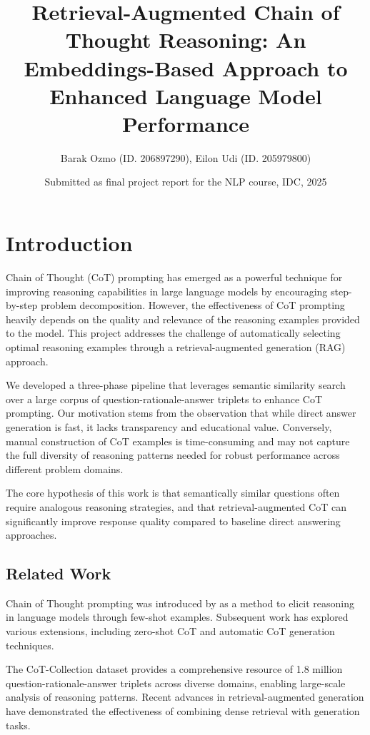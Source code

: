 \documentclass{article}
\title{Retrieval-Augmented Chain of Thought Reasoning: An Embeddings-Based Approach to Enhanced Language Model Performance}
\author{Barak Ozmo (ID. 206897290), Eilon Udi (ID. 205979800)}
\date{Submitted as final project report for the NLP course, IDC, 2025}
\begin{document}
\maketitle

\section{Introduction}

Chain of Thought (CoT) prompting has emerged as a powerful technique for improving reasoning capabilities in large language models by encouraging step-by-step problem decomposition. However, the effectiveness of CoT prompting heavily depends on the quality and relevance of the reasoning examples provided to the model. This project addresses the challenge of automatically selecting optimal reasoning examples through a retrieval-augmented generation (RAG) approach.

We developed a three-phase pipeline that leverages semantic similarity search over a large corpus of question-rationale-answer triplets to enhance CoT prompting. Our motivation stems from the observation that while direct answer generation is fast, it lacks transparency and educational value. Conversely, manual construction of CoT examples is time-consuming and may not capture the full diversity of reasoning patterns needed for robust performance across different problem domains.

The core hypothesis of this work is that semantically similar questions often require analogous reasoning strategies, and that retrieval-augmented CoT can significantly improve response quality compared to baseline direct answering approaches.

\subsection{Related Work}

Chain of Thought prompting was introduced by \cite{wei2022chain} as a method to elicit reasoning in language models through few-shot examples. Subsequent work has explored various extensions, including zero-shot CoT \cite{kojima2022zero} and automatic CoT generation techniques.

The CoT-Collection dataset \cite{cotcollection2022} provides a comprehensive resource of 1.8 million question-rationale-answer triplets across diverse domains, enabling large-scale analysis of reasoning patterns. Recent advances in retrieval-augmented generation \cite{lewis2020retrieval} have demonstrated the effectiveness of combining dense retrieval with generation tasks.
\end{document}
